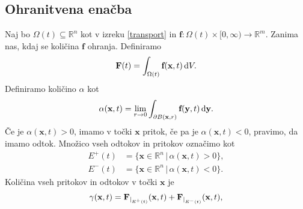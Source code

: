 \documentclass[mat2, tisk]{fmfdelo}
\newcommand{\R}{\mathbb R}
\newcommand{\bd}{\textbf}
\begin{document}
\subsection{Ohranitvena enačba} 

Naj bo $\Omega(t) \subseteq \R^n$ kot v izreku \ref{transport} in $\bd{f}: \Omega(t) \times [0, \infty) \rightarrow \R^m$.
Zanima nas, kdaj se količina $\bd{f}$ ohranja. Definiramo 
\begin{equation*}
\bd{F}(t) = \int_{\Omega(t)} \bd{f}(\bd{x}, t) \dif V.
\end{equation*}
Definiramo količino $\alpha$ kot 
\begin{equation*}
\alpha(\bd{x}, t) = \lim_{r \to 0} \int_{\partial B(\bd{x}, r)} \bd{f}(\bd{y}, t) \dif \bd{y}.
\end{equation*}
Če je $\alpha(\bd{x}, t) > 0$, imamo v točki $\bd{x}$ pritok, če pa je 
$\alpha(\bd{x}, t) < 0$, pravimo, da imamo odtok. Množico vseh odtokov in pritokov
označimo kot 
\begin{align*}
  E^+(t) &= \{\bd{x} \in \R^n \,|\, \alpha(\bd{x}, t) > 0\}, \\
  E^-(t) &= \{\bd{x} \in \R^n \,|\, \alpha(\bd{x}, t) < 0\}.
\end{align*}
Količina vseh pritokov in odtokov v točki $\bd{x}$ je
\begin{equation*}
\bd{\text{$\gamma$}}(\bd{x}, t) = \bd{F}_{|_{E^+(t)}}(\bd{x}, t) + \bd{F}_{|_{E^-(t)}}(\bd{x}, t),
\end{equation*}
\end{document}
